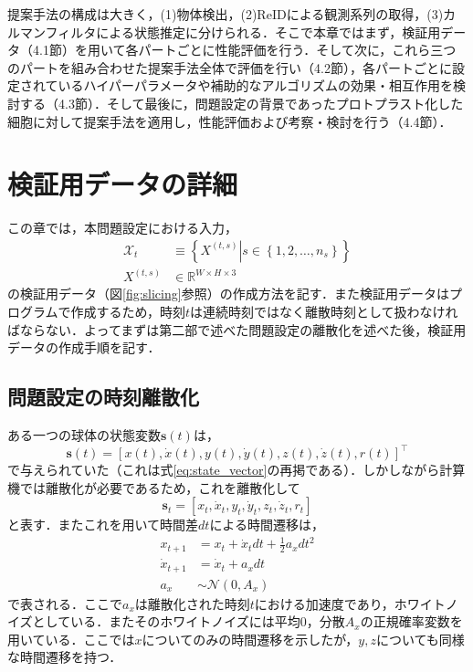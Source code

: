 \thispagestyle{fancy2}

提案手法の構成は大きく，(1)物体検出，(2)ReIDによる観測系列の取得，(3)カルマンフィルタによる状態推定に分けられる．そこで本章ではまず，検証用データ（4.1節）を用いて各パートごとに性能評価を行う．そして次に，これら三つのパートを組み合わせた提案手法全体で評価を行い（4.2節），各パートごとに設定されているハイパーパラメータや補助的なアルゴリズムの効果・相互作用を検討する（4.3節）．そして最後に，問題設定の背景であったプロトプラスト化した細胞に対して提案手法を適用し，性能評価および考察・検討を行う（4.4節）．

\section{検証用データの詳細}

この章では，本問題設定における入力，
\begin{equation}
    \label{eq:input_remind}
    \begin{aligned}
        \mathcal{X}_t &\equiv \left\{ \left.X^{(t,s)}\right| s \in \left\{1,2,\dots,n_s\right\} \right\}
        \\ X^{(t,s)} &\in \mathbb{R}^{W \times H \times 3}
    \end{aligned}    
\end{equation}
の検証用データ（図\ref{fig:slicing}参照）の作成方法を記す．また検証用データはプログラムで作成するため，時刻$t$は連続時刻ではなく離散時刻として扱わなければならない．よってまずは第二部で述べた問題設定の離散化を述べた後，検証用データの作成手順を記す．

    \subsection{問題設定の時刻離散化}
    ある一つの球体の状態変数$\bm{s}(t)$は，
    \begin{equation}
        \label{eq:state_vector_remind}
        \bm{s}(t) = \left[x(t), \dot{x}(t), y(t), \dot{y}(t), z(t), \dot{z}(t), r(t)\right]^{\top}
    \end{equation}
    で与えられていた（これは式\ref{eq:state_vector}の再掲である）．しかしながら計算機では離散化が必要であるため，これを離散化して
    \begin{equation}
        \label{eq:discreated_state_vector}
        \bm{s}_t = \left[x_t, \dot{x}_t, y_t, \dot{y}_t, z_t, \dot{z}_t, r_t\right]
    \end{equation}
    と表す．またこれを用いて時間差$dt$による時間遷移は，
    \begin{equation}
        \label{eq:discreated_transition}
        \begin{aligned}
            x_{t+1} &= x_t + \dot{x}_t dt + \frac{1}{2} a_x dt^2
            \\ \dot{x}_{t+1} &= \dot{x}_t + a_x dt
            \\ a_x & \sim \mathcal{N}(0, A_x)
        \end{aligned}
    \end{equation}
    で表される．ここで$a_x$は離散化された時刻$t$における加速度であり，ホワイトノイズとしている．またそのホワイトノイズには平均$0$，分散$A_x$の正規確率変数を用いている．ここでは$x$についてのみの時間遷移を示したが，$y, z$についても同様な時間遷移を持つ．

